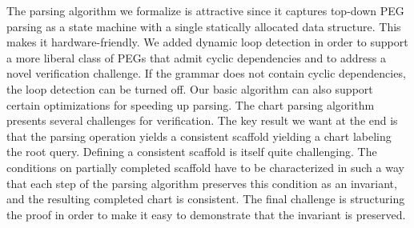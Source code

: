 The parsing algorithm we formalize is attractive since it captures
top-down PEG parsing as a state machine with a single statically
allocated data structure.  This makes it hardware-friendly.  We added
dynamic loop detection in order to support a more liberal class of 
PEGs that admit cyclic dependencies and to address a novel verification
challenge.  If the grammar does not contain cyclic dependencies, the
loop detection can be turned off.  Our basic
algorithm can also support certain optimizations for speeding up parsing.
The chart parsing algorithm presents several challenges for verification.
The key result we want at the end is that the parsing operation
yields a consistent scaffold yielding a chart labeling the root query.  Defining a consistent
scaffold is itself quite challenging.  The conditions on partially
completed scaffold have to be characterized in such a way that each step
of the parsing algorithm preserves this condition as an invariant, and
the resulting completed chart is consistent.  The final challenge is
structuring the proof in order to make it easy to demonstrate that the
invariant is preserved.  



